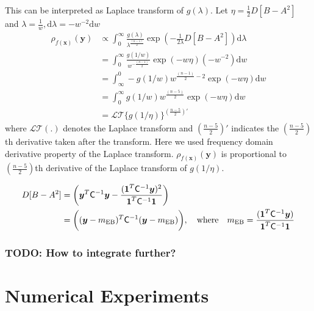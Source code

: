 \documentclass{svjour3}                     %
\newcommand{\bm}[1]{\boldsymbol{#1}}
\newcommand{\dif}[1]{\text{d}{#1}}
\newcommand{\vx}{\bm{x}}
\newcommand{\vy}{\bm{y}}
\newcommand{\vone}{\bm{1}}
\newcommand{\mCInv}{\mathsf{C}^{-1}}
\newcommand{\MLE}{\textup{EB}}
\begin{document}
This can be interpreted as Laplace transform of $g(\lambda)$.
Let $\eta = \frac{1}{2} D [B - A^2] $ and $\lambda = \frac{1}{w}, \dif{\lambda} = -w^{-2} \dif{w}$ 
\begin{align*}
\rho_{f(\vx)}(\vy) 
& \propto \int_{0}^\infty \frac{g(\lambda)}{\lambda^{\frac{(n-1)}{2}}}
\exp \left(  - \frac{1}{2\lambda} D [B - A^2] \right)
\dif{\lambda} 
\\
&= \int_{0}^\infty \frac{g(1/w)  }{w^{-\frac{(n-1)}{2}}}
\exp \left(  - w \eta \right)
(-w^{-2})\dif{w}
\\
&= \int_\infty^0 -g(1/w) w^{\frac{(n-1)}{2} - 2}
\exp \left(  - w \eta \right)
\dif{w}
\\
&= \int_{0}^\infty g(1/w) w^{\frac{(n-5)}{2}}
\exp \left(  - w \eta \right)
\dif{w}
\\
& = \mathcal{LT}\{ g(1/\eta) \}^{(\frac{n-5}{2})'}
\end{align*}
where $\mathcal{LT}(.)$ denotes the Laplace transform and $(\frac{n-5}2)'$ indicates the $(\frac{n-5}2)$th derivative taken after the transform.
Here we used frequency domain derivative property of the Laplace transform. 
$\rho_{f(\vx)}(\vy)$  is proportional to $(\frac{n-5}2)$th derivative of the Laplace transform of $g(1/\eta)$.

\begin{align*}
D [B - A^2] &= \left(\vy^T\mCInv\vy - \frac{(\vone^T\mCInv\vy)^2}{\vone^T\mCInv\vone} \right)
\\
&= \biggl((\vy-m_\MLE)^T \mCInv (\vy-m_\MLE) \biggr), 
\quad \text{where} \quad
m_\MLE=\frac{(\vone^T \mCInv \vy)}{\vone^T\mCInv\vone}
\end{align*}
\subsubsection{TODO: How to integrate further?}





















\section{Numerical Experiments}
\end{document}

